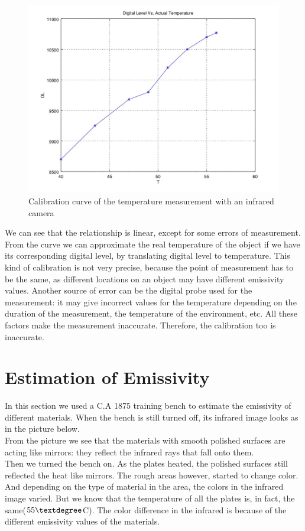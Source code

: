 \documentclass[english]{article}
\begin{document}
\begin{figure}[H]
	\centering
	\includegraphics[width=1\linewidth]{Pictures/calibplot.jpg}
	\caption{Calibration curve of the temperature measurement with an infrared camera}
	\label{fig:five}
\end{figure}

We can see that the relationship is linear, except for some errors of measurement.
From the curve we can approximate the real temperature of the object if we have its corresponding digital level, by translating digital level to temperature.
This kind of calibration is not very precise, because the point of measurement has to be the same, as different locations on an object may have different emissivity values.
Another source of error can be the digital probe used for the measurement: it may give incorrect values for the temperature depending on the duration of the measurement, the temperature of the environment, etc.
All these factors make the measurement inaccurate.
Therefore, the calibration too is inaccurate.
\section{Estimation of Emissivity}
In this section we used a C.A 1875 training bench to estimate the emissivity of different materials.
When the bench is still turned off, its infrared image looks as in the picture below.\\
From the picture we see that the materials with smooth polished surfaces are acting like mirrors: they reflect the infrared rays that fall onto them.\\
Then we turned the bench on.
As the plates heated, the polished surfaces still reflected the heat like mirrors.
The rough areas however, started to change color.
And depending on the type of material in the area, the colors in the infrared image varied.
But we know that the temperature of all the plates is, in fact, the same($55\textdegree$C).
The color difference in the infrared is because of the different emissivity values of the materials.
\end{document}
